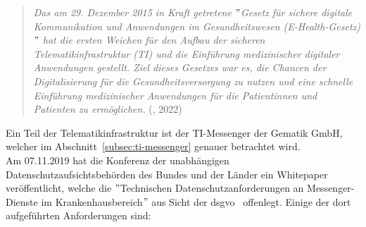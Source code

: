     \begin{quote}
    \textit{Das am 29. Dezember 2015 in Kraft getretene \("\)Gesetz für sichere digitale Kommunikation und Anwendungen im Gesundheitswesen (E-Health-Gesetz)\("\) hat die ersten Weichen für den Aufbau der sicheren Telematikinfrastruktur (TI) und die Einführung medizinischer digitaler Anwendungen gestellt.
    Ziel dieses Gesetzes war es, die Chancen der Digitalisierung für die Gesundheitsversorgung zu nutzen und eine schnelle Einführung medizinischer Anwendungen für die Patientinnen und Patienten zu ermöglichen.} (\citeauthor{ehealthgesetz}, 2022)
    \end{quote}

    Ein Teil der Telematikinfrastruktur ist der TI-Messenger der Gematik GmbH, welcher im Abschnitt~\ref{subsec:ti-messenger} genauer betrachtet wird.\\
    Am 07.11.2019 hat die Konferenz der unabhängigen Datenschutzaufsichtsbehörden des Bundes und der Länder ein Whitepaper veröffentlicht, welche die \("\)Technischen Datenschutzanforderungen an Messenger-Dienste im\linebreak
    Krankenhausbereich\("\) aus Sicht der \ac{dsgvo}~\cite{datenschutzkonferenz} offenlegt.
    Einige der dort aufgeführten Anforderungen sind:
